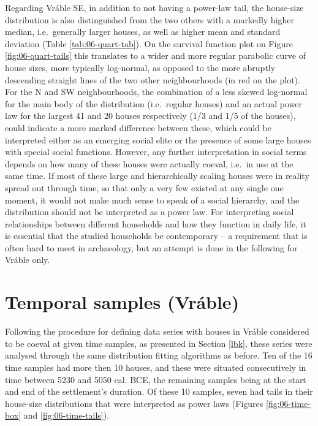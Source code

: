 \documentclass[
  12pt,
  a4paper, twoside]{book}
\begin{document}
Regarding Vráble SE, in addition to not having a power-law tail, the house-size distribution is also distinguished from the two others with a markedly higher median, i.e.~generally larger houses, as well as higher mean and standard deviation (Table \ref{tab:06-quart-tab}). On the survival function plot on Figure \ref{fig:06-quart-tails} this translates to a wider and more regular parabolic curve of house sizes, more typically log-normal, as opposed to the more abruptly descending straight lines of the two other neighbourhoods (in red on the plot). For the N and SW neighbourhoods, the combination of a less skewed log-normal for the main body of the distribution (i.e.~regular houses) and an actual power law for the largest 41 and 20 houses respectively (1/3 and 1/5 of the houses), could indicate a more marked difference between these, which could be interpreted either as an emerging social elite or the presence of some large houses with special social functions. However, any further interpretation in social terms depends on how many of these houses were actually coeval, i.e.~in use at the same time. If most of these large and hierarchically scaling houses were in reality spread out through time, so that only a very few existed at any single one moment, it would not make much sense to speak of a social hierarchy, and the distribution should not be interpreted as a power law. For interpreting social relationships between different households and how they function in daily life, it is essential that the studied households be contemporary -- a requirement that is often hard to meet in archaeology, but an attempt is done in the following for Vráble only.

\FloatBarrier

\hypertarget{temporal-samples-vruxe1ble}{%
\section{Temporal samples (Vráble)}\label{temporal-samples-vruxe1ble}}

Following the procedure for defining data series with houses in Vráble considered to be coeval at given time samples, as presented in Section \ref{lbk}, these series were analysed through the same distribution fitting algorithms as before. Ten of the 16 time samples had more then 10 houses, and these were situated consecutively in time between 5230 and 5050 cal. BCE, the remaining samples being at the start and end of the settlement's duration. Of these 10 samples, seven had tails in their house-size distributions that were interpreted as power laws (Figures \ref{fig:06-time-box} and \ref{fig:06-time-tails}).
\end{document}

